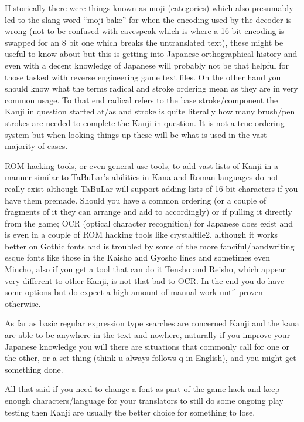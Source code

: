 \documentclass[
]{book}
\begin{document}
Historically there were things known as moji (categories) which also presumably led to the slang word ``moji bake'' for when the encoding used by the decoder is wrong (not to be confused with cavespeak which is where a 16 bit encoding is swapped for an 8 bit one which breaks the untranslated text), these might be useful to know about but this is getting into Japanese orthographical history and even with a decent knowledge of Japanese will probably not be that helpful for those tasked with reverse engineering game text files. On the other hand you should know what the terms radical and stroke ordering mean as they are in very common usage. To that end radical refers to the base stroke/component the Kanji in question started at/as and stroke is quite literally how many brush/pen strokes are needed to complete the Kanji in question. It is not a true ordering system but when looking things up these will be what is used in the vast majority of cases.

ROM hacking tools, or even general use tools, to add vast lists of Kanji in a manner similar to TaBuLar's abilities in Kana and Roman languages do not really exist although TaBuLar will support adding lists of 16 bit characters if you have them premade. Should you have a common ordering (or a couple of fragments of it they can arrange and add to accordingly) or if pulling it directly from the game; OCR (optical character recognition) for Japanese does exist and is even in a couple of ROM hacking tools like crystaltile2, although it works better on Gothic fonts and is troubled by some of the more fanciful/handwriting esque fonts like those in the Kaisho and Gyosho lines and sometimes even Mincho, also if you get a tool that can do it Tensho and Reisho, which appear very different to other Kanji, is not that bad to OCR. In the end you do have some options but do expect a high amount of manual work until proven otherwise.

As far as basic regular expression type searches are concerned Kanji and the kana are able to be anywhere in the text and nowhere, naturally if you improve your Japanese knowledge you will there are situations that commonly call for one or the other, or a set thing (think u always follows q in English), and you might get something done.

All that said if you need to change a font as part of the game hack and keep enough characters/language for your translators to still do some ongoing play testing then Kanji are usually the better choice for something to lose.
\end{document}
